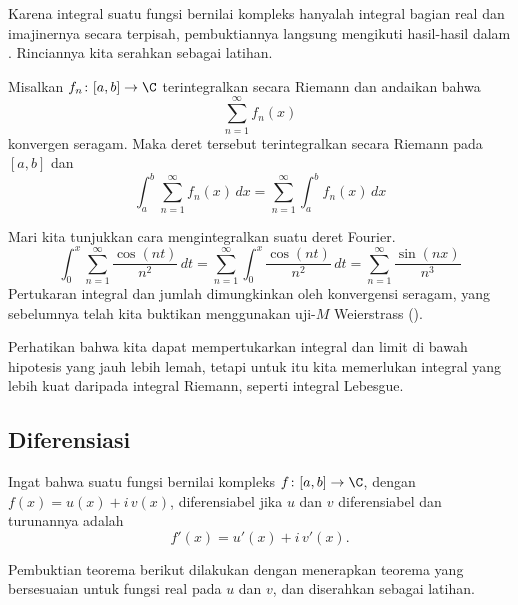 Karena integral suatu fungsi bernilai kompleks hanyalah integral
bagian real dan imajinernya secara terpisah,
pembuktiannya langsung mengikuti hasil-hasil dalam
.
Rinciannya kita serahkan sebagai latihan.

\begin{cor}
\pagebreak[2]
Misalkan $f_n \colon [a,b] \to \C$
terintegralkan secara Riemann dan andaikan bahwa
\begin{equation*}
\sum_{n=1}^\infty f_n(x)
\end{equation*}
konvergen seragam. Maka deret tersebut terintegralkan secara Riemann pada $[a,b]$
dan
\begin{equation*}
\int_a^b \sum_{n=1}^\infty f_n(x) \,dx
=
\sum_{n=1}^\infty \int_a^b f_n(x) \,dx
\end{equation*}
\end{cor}

\begin{example}
Mari kita tunjukkan cara mengintegralkan suatu deret Fourier.
\begin{equation*}
\int_{0}^x \sum_{n=1}^\infty \frac{\cos(nt)}{n^2} \,dt
=
\sum_{n=1}^\infty \int_{0}^x \frac{\cos(nt)}{n^2}\,dt
=
\sum_{n=1}^\infty \frac{\sin(nx)}{n^3}
\end{equation*}
Pertukaran integral dan jumlah dimungkinkan oleh konvergensi seragam,
yang sebelumnya telah kita buktikan menggunakan uji-$M$ Weierstrass
().
\end{example}

Perhatikan bahwa kita dapat mempertukarkan integral dan limit di bawah hipotesis yang jauh lebih lemah,
tetapi untuk itu kita memerlukan integral yang lebih kuat daripada integral Riemann,
seperti integral Lebesgue.

\subsection{Diferensiasi}

Ingat bahwa suatu fungsi bernilai kompleks
$f \colon [a,b] \to \C$, dengan $f(x) = u(x)+i\,v(x)$,
diferensiabel jika $u$ dan $v$ diferensiabel
dan turunannya adalah
\begin{equation*}
f'(x) = u'(x)+i\,v'(x) .
\end{equation*}

Pembuktian teorema berikut dilakukan dengan menerapkan teorema yang bersesuaian untuk
fungsi real pada $u$ dan $v$, dan diserahkan sebagai latihan.


